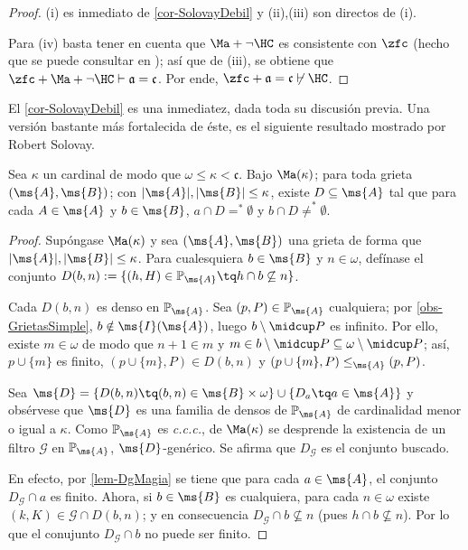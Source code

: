 	\begin{proof}
		(i) es inmediato de \ref{cor-SolovayDebil} y (ii),(iii) son directos de (i).

		Para (iv) basta tener en cuenta que $\Ma + \lnot \HC$ es consistente con $\zfc$ (hecho que se puede consultar en \cite[p.~279-281]{kunenSet}); así que de (iii), se obtiene que $\zfc + \Ma + \lnot \HC \vdash \mathfrak{a}=\mathfrak{c}$. Por ende, $\zfc + \mathfrak{a}=\mathfrak{c} \not\vdash \HC$. 
	\end{proof}

	El \autoref{cor-SolovayDebil} es una inmediatez, dada toda su discusión previa. Una versión bastante más fortalecida de éste, es el siguiente resultado mostrado por Robert Solovay.

	\begin{lema}[Solovay]\label{lem-Solovay}
		Sea $\kappa$ un cardinal de modo que $\omega \leq \kappa < \mathfrak{c}$. Bajo $\Ma(\kappa)$; para toda grieta $(\ms{A},\ms{B})$; con $|\ms{A}|,|\ms{B}|\leq \kappa$, existe $D\subseteq \ms{A}$ tal que para cada $A \in \ms{A}$ y $b \in \ms{B}$, $a \cap D=^*\emptyset$ y $b \cap D\neq ^*\emptyset$.
	\end{lema}

	\begin{proof}
		Supóngase $\Ma(\kappa)$ y sea $(\ms{A},\ms{B})$ una grieta de forma que $|\ms{A}|,|\ms{B}|\leq \kappa$. Para cualesquiera $b \in \ms{B}$ y $n \in \omega$, defínase el conjunto $D(b,n):=\{ (h,H) \in \mathbb{P}_\ms{A} \tq h \cap b \not\subseteq n \}$.

		Cada $D(b,n)$ es denso en $\mathbb{P}_\ms{A}$. Sea $(p,P) \in \mathbb{P}_\ms{A}$ cualquiera; por \ref{obs-GrietasSimple}, $b \notin \ms{I}(\ms{A}) $, luego $b \setminus \midcup P$ es infinito. Por ello, existe $m \in \omega$ de modo que $n+1 \in m$ y $m \in b \setminus \midcup P \subseteq \omega \setminus \midcup P$; así, $p \cup \{m\}$ es finito, $(p \cup \{m\}, P) \in D(b,n)$ y $(p \cup \{m\}, P) \leq_\ms{A} (p,P)$.

		Sea $\ms{D}=\{ D(b,n) \tq (b,n) \in \ms{B} \times \omega \} \cup \{D_a \tq a \in \ms{A} \}$ y obsérvese que $\ms{D}$ es una familia de densos de $\mathbb{P}_\ms{A}$ de cardinalidad menor o igual a $\kappa$. Como $\mathbb{P}_\ms{A}$ es \textit{c.c.c.}, de $\Ma(\kappa)$ se desprende la existencia de un filtro $\mathcal{G}$ en $\mathbb{P}_\ms{A}$, $\ms{D}$-genérico. Se afirma que $D_\mathcal{G}$ es el conjunto buscado.

		En efecto, por \ref{lem-DgMagia} se tiene que para cada $a \in \ms{A}$, el conjunto $D_\mathcal{G} \cap a$ es finito. Ahora, si $b \in \ms{B}$ es cualquiera, para cada $n \in \omega$ existe $(k,K) \in \mathcal{G} \cap D(b,n)$; y en consecuencia $D_\mathcal{G} \cap b \not \subseteq n$ (pues $h \cap b \not \subseteq n$). Por lo que el conujunto $D_\mathcal{G} \cap b$ no puede ser finito. 
	\end{proof}

